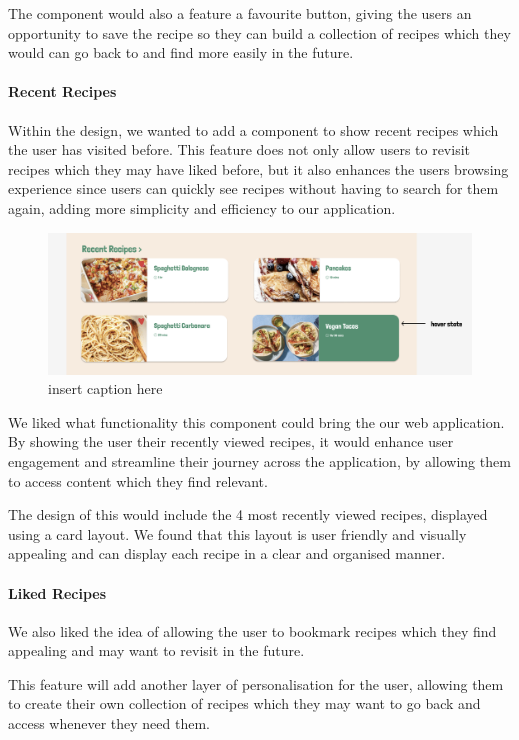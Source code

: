 \documentclass{article}
\begin{document}
The component would also a feature a favourite button, giving the users an opportunity to save the recipe so they can build a collection of recipes which they would can go back to and find more easily in the future.

\paragraph{Recent Recipes}
Within the design, we wanted to add a component to show recent recipes which the user has visited before. This feature does not only allow users to revisit recipes which they may have liked before, but it also enhances the users browsing experience since users can quickly see recipes without having to search for them again, adding more simplicity and efficiency to our application.

\begin{figure}[htbp]
  \includegraphics[width=1.0\textwidth]{assets/Version 1 Recent Recipes.png}
  \centering
  \caption{insert caption here}
\end{figure}

We liked what functionality this component could bring the our web application. By showing the user their recently viewed recipes, it would enhance user engagement and streamline their journey across the application, by allowing them to access content which they find relevant.

The design of this would include the 4 most recently viewed recipes, displayed using a card layout. We found that this layout is user friendly and visually appealing and can display each recipe in a clear and organised manner.

\paragraph{Liked Recipes}
We also liked the idea of allowing the user to bookmark recipes which they find appealing and may want to revisit in the future.

This feature will add another layer of personalisation for the user, allowing them to create their own collection of recipes which they may want to go back and access whenever they need them.
\end{document}
